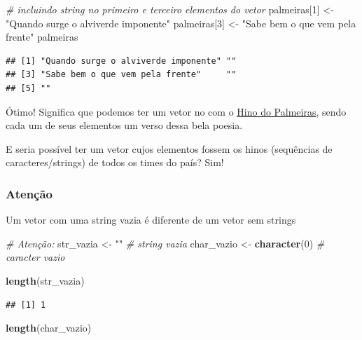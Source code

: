 \documentclass[]{book}
\newenvironment{Shaded}{\begin{snugshade}}{\end{snugshade}}
\newcommand{\CommentTok}[1]{\textcolor[rgb]{0.56,0.35,0.01}{\textit{#1}}}
\newcommand{\DecValTok}[1]{\textcolor[rgb]{0.00,0.00,0.81}{#1}}
\newcommand{\KeywordTok}[1]{\textcolor[rgb]{0.13,0.29,0.53}{\textbf{#1}}}
\newcommand{\NormalTok}[1]{#1}
\newcommand{\StringTok}[1]{\textcolor[rgb]{0.31,0.60,0.02}{#1}}
\begin{document}
\begin{Shaded}
\begin{Highlighting}[]
\CommentTok{# incluindo string no primeiro e terceiro elementos do vetor}
\NormalTok{palmeiras[}\DecValTok{1}\NormalTok{] <-}\StringTok{ "Quando surge o alviverde imponente"}
\NormalTok{palmeiras[}\DecValTok{3}\NormalTok{] <-}\StringTok{ "Sabe bem o que vem pela frente"}
\NormalTok{palmeiras}
\end{Highlighting}
\end{Shaded}

\begin{verbatim}
## [1] "Quando surge o alviverde imponente" ""                                  
## [3] "Sabe bem o que vem pela frente"     ""                                  
## [5] ""
\end{verbatim}

Ótimo! Significa que podemos ter um vetor no com o \href{http://www.palmeiras.com.br/historia/hino}{Hino do Palmeiras}, sendo cada um de seus elementos um verso dessa bela poesia.

E seria possível ter um vetor cujos elementos fossem os hinos (sequências de caracteres/strings) de todos os times do país? Sim!

\hypertarget{atenuxe7uxe3o}{%
\subsubsection{Atenção}\label{atenuxe7uxe3o}}

Um vetor com uma string vazia é diferente de um vetor sem strings

\begin{Shaded}
\begin{Highlighting}[]
\CommentTok{# Atenção:}
\NormalTok{str_vazia <-}\StringTok{ ""}  \CommentTok{# string vazia}
\NormalTok{char_vazio <-}\StringTok{ }\KeywordTok{character}\NormalTok{(}\DecValTok{0}\NormalTok{)  }\CommentTok{# caracter vazio}

\KeywordTok{length}\NormalTok{(str_vazia)}
\end{Highlighting}
\end{Shaded}

\begin{verbatim}
## [1] 1
\end{verbatim}

\begin{Shaded}
\begin{Highlighting}[]
\KeywordTok{length}\NormalTok{(char_vazio)}
\end{Highlighting}
\end{Shaded}
\end{document}
